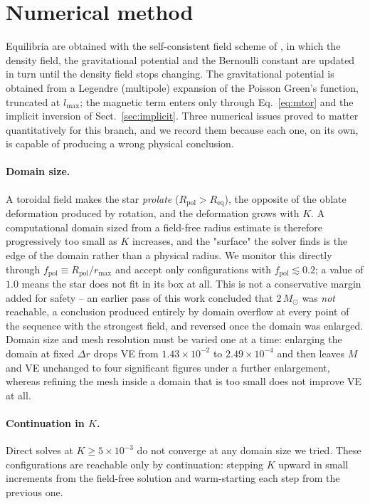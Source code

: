 \documentclass{aa}
\begin{document}

\section{Numerical method}
\label{sec:scf}

Equilibria are obtained with the self-consistent field scheme of
\citet{hachisu1986}, in which the density field, the gravitational
potential and the Bernoulli constant are updated in turn until the
density field stops changing. The gravitational potential is obtained
from a Legendre (multipole) expansion of the Poisson Green's function,
truncated at $l_{\max}$; the magnetic term enters only through
Eq.~\ref{eq:mtor} and the implicit inversion of
Sect.~\ref{sec:implicit}. Three numerical issues proved to matter
quantitatively for this branch, and we record them because each one, on
its own, is capable of producing a wrong physical conclusion.

\paragraph{Domain size.} A toroidal field makes the star \emph{prolate}
($R_{\mathrm{pol}} > R_{\mathrm{eq}}$), the opposite of the oblate
deformation produced by rotation, and the deformation grows with $K$.
A computational domain sized from a field-free radius estimate is
therefore progressively too small as $K$ increases, and the "surface"
the solver finds is the edge of the domain rather than a physical
radius. We monitor this directly through
$f_{\mathrm{pol}} \equiv R_{\mathrm{pol}}/r_{\max}$ and accept only
configurations with $f_{\mathrm{pol}} \lesssim 0.2$; a value of $1.0$
means the star does not fit in its box at all. This is not a
conservative margin added for safety -- an earlier pass of this work
concluded that $2\,M_\odot$ was \emph{not} reachable, a conclusion
produced entirely by domain overflow at every point of the sequence
with the strongest field, and reversed once the domain was enlarged.
Domain size and mesh resolution must be varied one at a time: enlarging
the domain at fixed $\Delta r$ drops VE from $1.43\times10^{-2}$ to
$2.49\times10^{-4}$ and then leaves $M$ and VE unchanged to four
significant figures under a further enlargement, whereas refining the
mesh inside a domain that is too small does not improve VE at all.

\paragraph{Continuation in $K$.} Direct solves at $K \ge 5\times10^{-3}$
do not converge at any domain size we tried. These configurations are
reachable only by continuation: stepping $K$ upward in small increments
from the field-free solution and warm-starting each step from the
previous one.
\end{document}
